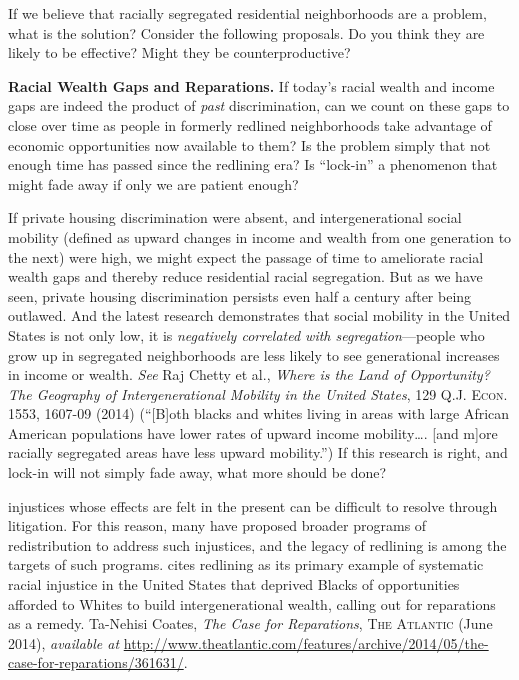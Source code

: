 If we believe that racially segregated residential neighborhoods are a problem,
what is the solution? Consider the following proposals. Do you think they are
likely to be effective? Might they be counterproductive?

\begin{questions}[]
\item \textbf{Racial Wealth Gaps and Reparations.} If today's racial wealth and
income gaps are indeed the product of \textit{past} discrimination, can we
count on these gaps to close over time as people in formerly redlined
neighborhoods take advantage of economic opportunities now available to them?
Is the problem simply that not enough time has passed since the redlining era?
Is ``lock-in'' a phenomenon that might fade away if only we are patient enough?

If private housing discrimination were absent, and intergenerational social
mobility (defined as upward changes in income and wealth from one generation to
the next) were high, we might expect the passage of time to ameliorate racial
wealth gaps and thereby reduce residential racial segregation. But as we have
seen, private housing discrimination persists even half a century after being
outlawed. And the latest research demonstrates that social mobility in the
United States is not only low, it is \textit{negatively correlated with
segregation}{}---people who grow up in segregated neighborhoods are less likely
to see generational increases in income or wealth. \textit{See} Raj Chetty et
al., \textit{Where is the Land of Opportunity? The Geography of
Intergenerational Mobility in the United States}, 129 \textsc{Q.J. Econ.}
1553, 1607-09 (2014) (``[B]oth blacks and whites living in areas with large
African American populations have lower rates of upward income mobility\dots.
[and m]ore racially segregated areas have less upward mobility.'') If this
research is right, and lock-in will not simply fade away, what more should be
done?

 injustices whose
effects
are felt in the present can be difficult to resolve through litigation. For
this reason, many have proposed broader programs of redistribution to address
such injustices, and the legacy of redlining is among the targets of such
programs.
 cites redlining as its primary example of systematic racial injustice in
the United States that deprived Blacks of opportunities afforded to Whites to
build intergenerational wealth, calling out for reparations as a remedy.
Ta-Nehisi Coates, \textit{The Case for Reparations}, \textsc{The Atlantic} (June
2014), \textit{available at}
\url{http://www.theatlantic.com/features/archive/2014/05/the-case-for-reparations/361631/}.



\end{questions}
